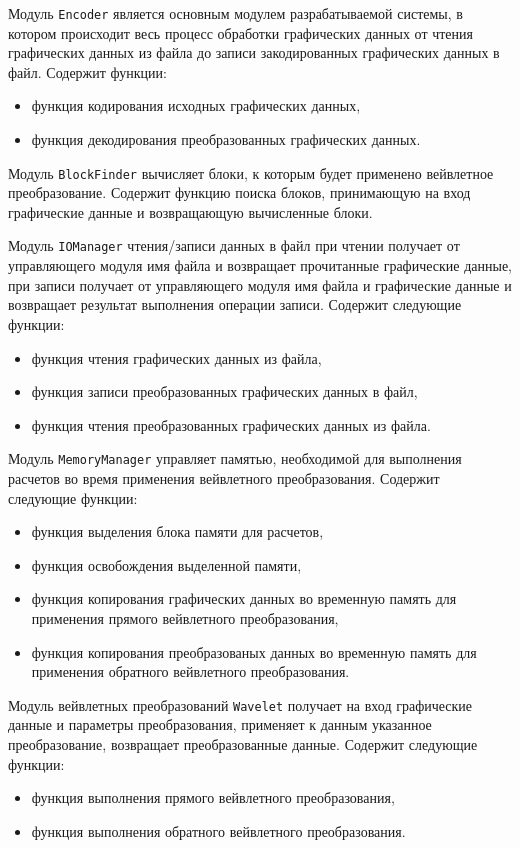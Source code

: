 Модуль \texttt{Encoder} является основным модулем разрабатываемой системы, в котором происходит весь процесс обработки 
графических данных от чтения графических данных из файла до записи закодированных графических данных в файл.
Содержит функции:

\begin{itemize}
 \item функция кодирования исходных графических данных,
 \item функция декодирования преобразованных графических данных.
\end{itemize}

Модуль \texttt{BlockFinder} вычисляет блоки, к которым будет применено вейвлетное преобразование. Содержит функцию
поиска блоков, принимающую на вход графические данные и возвращающую вычисленные блоки.

Модуль \texttt{IOManager} чтения/записи данных в файл при чтении получает от управляющего модуля имя файла и возвращает прочитанные графические данные, 
при записи получает от управляющего модуля имя файла и графические данные и возвращает результат выполнения операции записи. 
Содержит следующие функции:
\begin{itemize}
 \item функция чтения графических данных из файла,
 \item функция записи преобразованных графических данных в файл,
 \item функция чтения преобразованных графических данных из файла.
\end{itemize}

Модуль \texttt{MemoryManager} управляет памятью, необходимой для выполнения расчетов во время применения вейвлетного преобразования.
Содержит следующие функции:
\begin{itemize}
 \item функция выделения блока памяти для расчетов,
 \item функция освобождения выделенной памяти,
 \item функция копирования графических данных во временную память для применения прямого вейвлетного преобразования,
 \item функция копирования преобразованых данных во временную память для применения обратного вейвлетного преобразования.
\end{itemize}

Модуль вейвлетных преобразований \texttt{Wavelet} получает на вход графические данные и параметры преобразования, 
применяет к данным указанное преобразование, возвращает преобразованные данные. Содержит следующие функции:
\begin{itemize}
\item функция выполнения прямого вейвлетного преобразования,
\item функция выполнения обратного вейвлетного преобразования.
\end{itemize}

